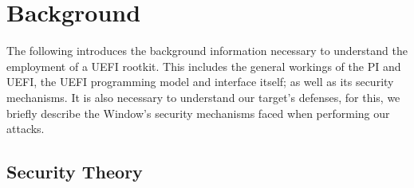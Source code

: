 
\chapter{Background}

The following introduces the background information necessary to understand the employment of a \ac{UEFI} rootkit. This includes the general workings of the \acf{PI} and \ac{UEFI}, the \ac{UEFI} programming model and interface itself; as well as its security mechanisms. It is also necessary to understand our target's defenses, for this, we briefly describe the Window's security mechanisms faced when performing our attacks.

\section{Security Theory}



